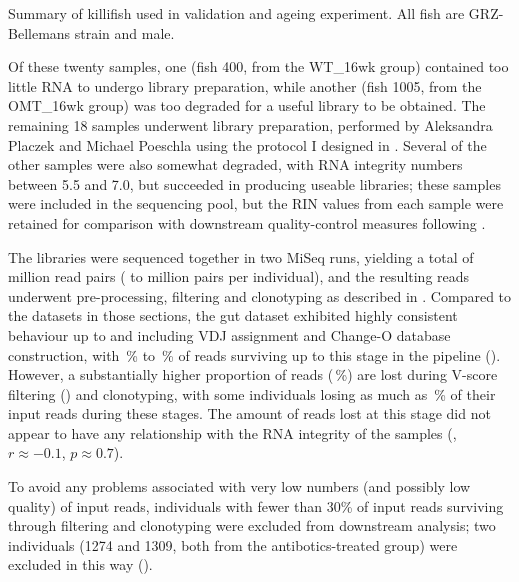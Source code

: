 \begin{table}[b]

\caption{Summary of killifish used in \igseq validation and ageing experiment. All fish are GRZ-Bellemans strain and male.}
\label{tab:gut-cohorts-summary}
\end{table}

Of these twenty samples, one (fish 400, from the WT\_16wk group) contained too little RNA to undergo \igseq library preparation, while another (fish 1005, from the OMT\_16wk group) was too degraded for a useful library to be obtained. The remaining 18 samples underwent \igseq library preparation, performed by Aleksandra Placzek and Michael Poeschla using the protocol I designed in . Several of the other samples were also somewhat degraded, with RNA integrity numbers between 5.5 and 7.0, but succeeded in producing useable libraries; these samples were included in the sequencing pool, but the RIN values from each sample were retained for comparison with downstream quality-control measures following \Igseq.

The libraries were sequenced together in two MiSeq runs, yielding a total of  million read pairs ( to  million pairs per individual), and the resulting reads underwent pre-processing, filtering and clonotyping as described in . Compared to the datasets in those sections, the gut dataset exhibited highly consistent behaviour up to and including VDJ assignment and Change-O database construction, with \,\% to \,\% of reads surviving up to this stage in the pipeline (). However, a substantially higher proportion of reads (\,\%) are lost during V-score filtering () and clonotyping, with some individuals losing as much as \,\% of their input reads during these stages. The amount of reads lost at this stage did not appear to have any relationship with the RNA integrity of the samples (, $r \approx -0.1$, $p \approx 0.7$).

To avoid any problems associated with very low numbers (and possibly low quality) of input reads, individuals with fewer than 30\% of input reads surviving through filtering and clonotyping were excluded from downstream analysis; two individuals (1274 and 1309, both from the antibotics-treated group) were excluded in this way ().

